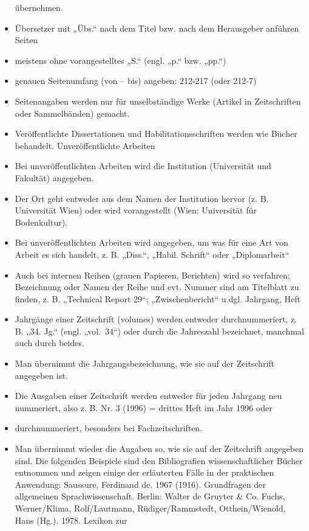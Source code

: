 \documentclass[]{book}
\theoremstyle{definition}
\theoremstyle{definition}
\theoremstyle{definition}
\theoremstyle{remark}
\begin{document}
\begin{itemize}
  übernehmen.
\item
  Übersetzer mit „Übs.`` nach dem Titel bzw. nach dem Herausgeber
  anführen Seiten
\item
  meistens ohne vorangestelltes „S.`` (engl. „p.`` bzw. „pp.``)
\item
  genauen Seitenumfang (von -- bis) angeben: 212-217 (oder 212-7)
\item
  Seitenangaben werden nur für unselbständige Werke (Artikel in
  Zeitschriften oder Sammelbänden) gemacht.
\item
  Veröffentlichte Dissertationen und Habilitationsschriften werden wie
  Bücher behandelt. Unveröffentlichte Arbeiten
\item
  Bei unveröffentlichten Arbeiten wird die Institution (Universität und
  Fakultät) angegeben.
\item
  Der Ort geht entweder aus dem Namen der Institution hervor (z. B.
  Universität Wien) oder wird vorangestellt (Wien: Universität für
  Bodenkultur).
\item
  Bei unveröffentlichten Arbeiten wird angegeben, um was für eine Art
  von Arbeit es sich handelt, z. B. „Diss.``, „Habil. Schrift`` oder
  „Diplomarbeit``
\item
  Auch bei internen Reihen (grauen Papieren, Berichten) wird so
  verfahren; Bezeichnung oder Namen der Reihe und evt. Nummer sind am
  Titelblatt zu finden, z. B. „Technical Report 29``; „Zwischenbericht``
  u.dgl. Jahrgang, Heft
\item
  Jahrgänge einer Zeitschrift (volumes) werden entweder durchnummeriert,
  z. B. „34. Jg.`` (engl. „vol.~34``) oder durch die Jahreszahl
  bezeichnet, manchmal auch durch beides.
\item
  Man übernimmt die Jahrgangsbezeichnung, wie sie auf der Zeitschrift
  angegeben ist.
\item
  Die Ausgaben einer Zeitschrift werden entweder für jeden Jahrgang neu
  nummeriert, also z. B. Nr. 3 (1996) = drittes Heft im Jahr 1996 oder
\item
  durchnummeriert, besonders bei Fachzeitschriften.
\item
  Man übernimmt wieder die Angaben so, wie sie auf der Zeitschrift
  angegeben sind. Die folgenden Beispiele sind den Bibliografien
  wissenschaftlicher Bücher entnommen und zeigen einige der erläuterten
  Fälle in der praktischen Anwendung: Saussure, Ferdinand de. 1967
  (1916). Grundfragen der allgemeinen Sprachwissenschaft. Berlin: Walter
  de Gruyter \& Co. Fuchs, Werner/Klima, Rolf/Lautmann,
  Rüdiger/Rammstedt, Otthein/Wienold, Hans (Hg.). 1978. Lexikon zur

\end{itemize}
\end{document}
